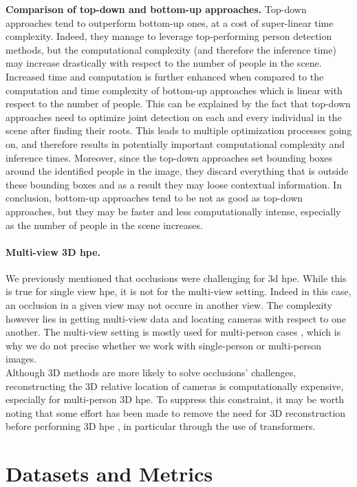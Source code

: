 \documentclass[runningheads]{llncs}
\begin{document}
\textbf{Comparison of top-down and bottom-up approaches.} Top-down approaches tend to outperform bottom-up ones, at a cost of super-linear time complexity. Indeed, they manage to leverage top-performing person detection methods, but the computational complexity (and therefore the inference time) may increase drastically with respect to the number of people in the scene. Increased time and computation is further enhanced when compared to the computation and time complexity of bottom-up approaches which is linear with respect to the number of people. This can be explained by the fact that top-down approaches need to optimize joint detection on each and every individual in the scene after finding their roots. This leads to multiple optimization processes going on, and therefore results in potentially important computational complexity and inference times. Moreover, since the top-down approaches set bounding boxes around the identified people in the image, they discard everything that is outside these bounding boxes and as a result they may loose contextual information. In conclusion, bottom-up approaches tend to be not as good as top-down approaches, but they may be faster and less computationally intense, especially as the number of people in the scene increases.


\paragraph{Multi-view 3D \ac{hpe}.}
We previously mentioned that occlusions were challenging for 3d \ac{hpe}. While this is true for single view \ac{hpe}, it is not for the multi-view setting. Indeed in this case, an occlusion in a given view may not occure in another view. The complexity however lies in getting multi-view data and locating cameras with respect to one another. The multi-view setting is mostly used for multi-person cases \cite{survey}, which is why we do not precise whether we work with single-person or multi-person images. \\
Although 3D methods are more likely to solve occlusions' challenges, reconstructing the 3D relative location of cameras is computationally expensive, especially for multi-person 3D \ac{hpe}. To suppress this constraint, it may be worth noting that some effort has been made to remove the need for 3D reconstruction before performing 3D \ac{hpe} \cite{Multi-view Pose transformer}, in particular through the use of transformers.

\section{Datasets and Metrics}
\end{document}
